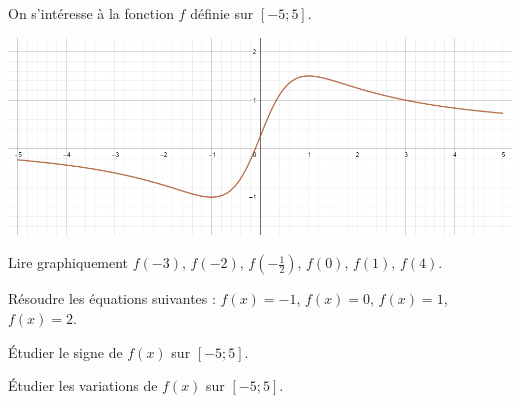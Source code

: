 
On s'intéresse à la fonction $f$ définie sur $[-5;5]$.

\begin{center}
	\includegraphics[scale=0.5]{fct}
\end{center}

\begin{questions}
	
	\question[3] Lire graphiquement $f(-3)$, $f(-2)$, $f(-\frac{1}{2})$, $f(0)$, $f(1)$, $f(4)$.
	
	\fillwithdottedlines{2cm}
	
	\question[2] Résoudre les équations suivantes : $f(x)=-1$, $f(x)=0$, $f(x)=1$, $f(x)=2$.
	
	\fillwithdottedlines{3cm}
	
	\question[3] \'Etudier le signe de $f(x)$ sur $[-5;5]$.
	
	\fillwithdottedlines{3cm}
	
	\question[3] \'Etudier les variations de $f(x)$ sur $[-5;5]$.
	
	\fillwithdottedlines{4cm}
\end{questions}